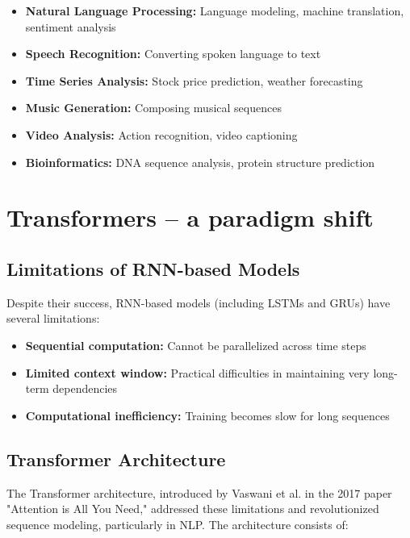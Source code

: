 \documentclass[11pt,a4paper]{report}
\begin{document}
\begin{itemize}
    \item \textbf{Natural Language Processing:} Language modeling, machine translation, sentiment analysis
    \item \textbf{Speech Recognition:} Converting spoken language to text
    \item \textbf{Time Series Analysis:} Stock price prediction, weather forecasting
    \item \textbf{Music Generation:} Composing musical sequences
    \item \textbf{Video Analysis:} Action recognition, video captioning
    \item \textbf{Bioinformatics:} DNA sequence analysis, protein structure prediction
\end{itemize}

\section{Transformers – a paradigm shift}

\subsection{Limitations of RNN-based Models}
Despite their success, RNN-based models (including LSTMs and GRUs) have several limitations:

\begin{itemize}
    \item \textbf{Sequential computation:} Cannot be parallelized across time steps
    \item \textbf{Limited context window:} Practical difficulties in maintaining very long-term dependencies
    \item \textbf{Computational inefficiency:} Training becomes slow for long sequences
\end{itemize}

\subsection{Transformer Architecture}
The Transformer architecture, introduced by Vaswani et al. in the 2017 paper "Attention is All You Need," addressed these limitations and revolutionized sequence modeling, particularly in NLP. The architecture consists of:
\end{document}
